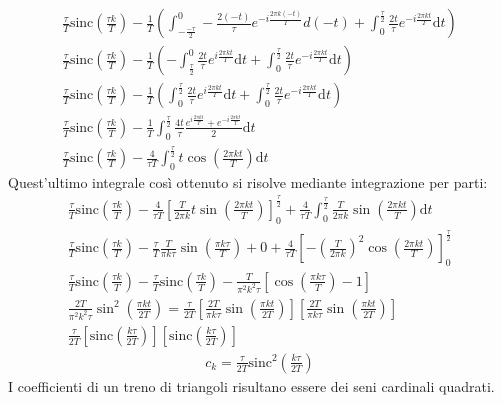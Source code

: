 \documentclass{article}
\newcommand{\sinc}{\mathrm{sinc}}
\newcommand{\df}{\mathrm{d}}
\begin{document}
\begin{gather*}
    \displaystyle\frac{\tau}{T}\sinc\left(\frac{\tau k}{T}\right)-\frac{1}{T}\left(\int_{-\frac{-\tau}{2}}^{0}-\frac{2(-t)}{\tau}e^{-i\frac{2\pi k(-t)}{T}}d(-t)+\int_{0}^{\frac{\tau}{2}}\frac{2t}{\tau}e^{-i\frac{2\pi kt}{T}}\df t\right)\\
    \displaystyle\frac{\tau}{T}\sinc\left(\frac{\tau k}{T}\right)-\frac{1}{T}\left(-\int_{\frac{\tau}{2}}^{0}\frac{2t}{\tau}e^{i\frac{2\pi kt}{T}}\df t+\int_{0}^{\frac{\tau}{2}}\frac{2t}{\tau}e^{-i\frac{2\pi kt}{T}}\df t\right)\\
    \displaystyle\frac{\tau}{T}\sinc\left(\frac{\tau k}{T}\right)-\frac{1}{T}\left(\int^{\frac{\tau}{2}}_{0}\frac{2t}{\tau}e^{i\frac{2\pi kt}{T}}\df t+\int_{0}^{\frac{\tau}{2}}\frac{2t}{\tau}e^{-i\frac{2\pi kt}{T}}\df t\right)\\
    \displaystyle\frac{\tau}{T}\sinc\left(\frac{\tau k}{T}\right)-\frac{1}{T}\int^{\frac{\tau}{2}}_{0}\frac{4t}{\tau}\frac{e^{i\frac{2\pi kt}{T}}+e^{-i\frac{2\pi kt}{T}}}{2}\df t\\
    \displaystyle\frac{\tau}{T}\sinc\left(\frac{\tau k}{T}\right)-\frac{4}{\tau T}\int_{0}^{\frac{\tau}{2}}t\cos\left(\frac{2\pi kt}{T}\right)\df t
\end{gather*}
Quest'ultimo integrale così ottenuto si risolve mediante integrazione per parti:
\begin{gather*}
    \displaystyle\frac{\tau}{T}\sinc\left(\frac{\tau k}{T}\right)-\frac{4}{\tau T}\left[\frac{T}{2\pi k}t\sin\left(\frac{2\pi kt}{T}\right)\right]^{\frac{\tau}{2}}_0
    +\frac{4}{\tau T}\int_{0}^{\frac{\tau}{2}}\frac{T}{2\pi k}\sin\left(\frac{2\pi kt}{T}\right)\df t\\
    \displaystyle\frac{\tau}{T}\sinc\left(\frac{\tau k}{T}\right)-\frac{\tau}{T}\frac{T}{\pi k\tau}\sin\left(\frac{\pi k\tau}{T}\right)+0+
    \frac{4}{\tau T}\left[-\left(\frac{T}{2\pi k}\right)^2\cos\left(\frac{2\pi kt}{T}\right)\right]^{\frac{\tau}{2}}_0\\
    \displaystyle\frac{\tau}{T}\sinc\left(\frac{\tau k}{T}\right)-\displaystyle\frac{\tau}{T}\sinc\left(\frac{\tau k}{T}\right)-
    \frac{T}{\pi^2k^2\tau}\left[\cos\left(\frac{\pi k\tau}{T}\right)-1\right]\\
    \displaystyle\frac{2T}{\pi^2k^2\tau}\sin^2\left(\frac{\pi kt}{2T}\right)=
    \frac{\tau}{2T}\left[\frac{2T}{\pi k\tau}\sin\left(\frac{\pi kt}{2T}\right)\right]\left[\frac{2T}{\pi k\tau}\sin\left(\frac{\pi kt}{2T}\right)\right]\\
    \displaystyle\frac{\tau}{2T}\left[\sinc\left(\frac{k\tau}{2T}\right)\right]\left[\sinc\left(\frac{k\tau}{2T}\right)\right]
\end{gather*}
\begin{gather}
    c_k=\displaystyle\frac{\tau}{2T}\sinc^2\left(\frac{k\tau }{2T}\right)
\end{gather}
I coefficienti di un treno di triangoli risultano essere dei seni cardinali quadrati. 
\end{document}
